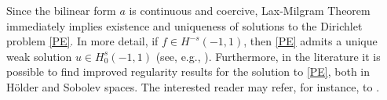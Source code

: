 Since the bilinear form $a$ is continuous and coercive, Lax-Milgram Theorem immediately implies existence and uniqueness of solutions to the Dirichlet problem \eqref{PE}. In more detail, if $f\in H^{-s}(-1,1)$, then \eqref{PE} admits a unique weak solution $u\in H_0^s(-1,1)$ (see, e.g., \cite[Proposition 2.1]{biccari2017local}). Furthermore, in the literature it is possible to find improved regularity results for the solution to \eqref{PE}, both in H\"older and Sobolev spaces. The interested reader may refer, for instance, to \cite{acosta2017fractional,biccari2017local,leonori2015basic,ros2014dirichlet,ros2014extremal}.

